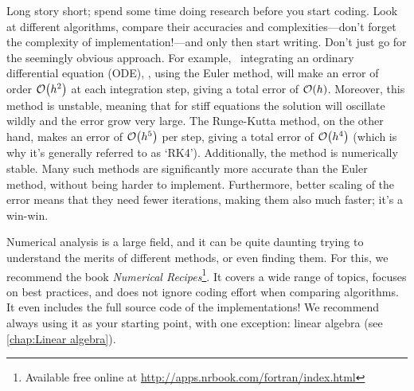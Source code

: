 Long story short; spend some time doing research before you start coding.
Look at different algorithms, compare their accuracies and complexities---don't forget the complexity of implementation!---and only then start writing.
Don't just go for the seemingly obvious approach.
For example, \naively\ integrating an ordinary differential equation (ODE), \eg, using the Euler method, will make an error of order $\mathcal{O}\!\left(h^2\right)$ at each integration step, giving a total error of $\mathcal{O}\!\left(h\right)$.
Moreover, this method is unstable, meaning that for stiff equations the solution will oscillate wildly and the error grow very large.
The Runge-Kutta method, on the other hand, makes an error of $\mathcal{O}\!\left(h^5\right)$ per step, giving a total error of $\mathcal{O}\!\left(h^4\right)$ (which is why it's generally referred to as `RK4').
Additionally, the method is numerically stable.
Many such methods are significantly more accurate than the Euler method, without being harder to implement.
Furthermore, better scaling of the error means that they need fewer iterations, making them also much faster; it's a win-win.

Numerical analysis is a large field, and it can be quite daunting trying to understand the merits of different methods, or even finding them.
For this, we recommend the book \emph{Numerical Recipes}\footnote{Available free online at \url{http://apps.nrbook.com/fortran/index.html}}.
It covers a wide range of topics, focuses on best practices, and does not ignore coding effort when comparing algorithms.
It even includes the full source code of the implementations! We recommend always using it as your starting point, with one exception: linear algebra (see \autoref{chap:Linear algebra}).


